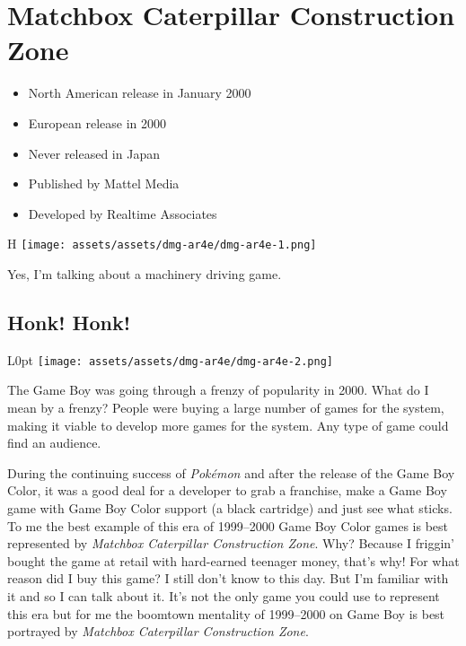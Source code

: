 \documentclass{book}
\begin{document}
\begingroup \chapter*{Matchbox Caterpillar Construction Zone} \endgroup

\begin{itemize} \setlength\itemsep{-0.4em}
\item North American release in January 2000
\item European release in 2000
\item Never released in Japan
\item Published by Mattel Media
\item Developed by Realtime Associates
\end{itemize}\noindent

\begin{wrapfigure}{H}{\linewidth}
\vskip 4pt
\centering \texttt{[image: assets/assets/dmg-ar4e/dmg-ar4e-1.png]}\par\pagetwodescription Yes, I’m talking about a machinery driving game.\end{wrapfigure}
\clearpage

\FloatBarrier\needspace{10mm}\section*{Honk! Honk!}\nopagebreak[4]

\begin{wrapfigure}{L}{0pt} \texttt{[image: assets/assets/dmg-ar4e/dmg-ar4e-2.png]}\end{wrapfigure}
The Game Boy was going through a frenzy of popularity in 2000. What do I mean by a frenzy? People were buying a large number of games for the system, making it viable to develop more games for the system. Any type of game could find an audience.

During the continuing success of \emph{Pokémon} and after the release of the Game Boy Color, it was a good deal for a developer to grab a franchise, make a Game Boy game with Game Boy Color support (a black cartridge) and just see what sticks. To me the best example of this era of 1999–2000 Game Boy Color games is best represented by \emph{Matchbox Caterpillar Construction Zone}. Why? Because I friggin’ bought the game at retail with hard-earned teenager money, that’s why! For what reason did I buy this game? I still don’t know to this day. But I’m familiar with it and so I can talk about it. It’s not the only game you could use to represent this era but for me the boomtown mentality of 1999–2000 on Game Boy is best portrayed by \emph{Matchbox Caterpillar Construction Zone}.
\end{document}
